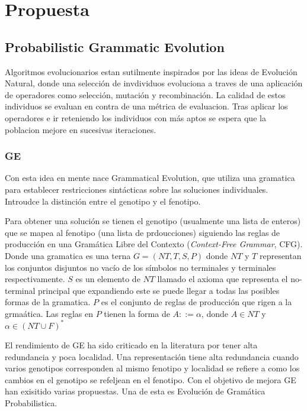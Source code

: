 \chapter{Propuesta}\label{chapter:proposal}

\section{Probabilistic Grammatic Evolution}

Algoritmos evolucionarios estan sutilmente inspirados por las ideas de Evoluci\'on Natural, donde una selecci\'on de invdividuos evoluciona a traves de una aplicaci\'on de operadores como selecci\'on, mutaci\'on y recombinaci\'on. La calidad de estos individuos se evaluan en contra de una m\'etrica de evaluacion. Tras aplicar los operadores e ir reteniendo los individuos con m\'as aptos se espera que la poblacion mejore en sucesivas iteraciones.

\subsection{GE}
Con esta idea en mente nace Grammatical Evolution, que utiliza una gramatica para establecer restricciones sint\'acticas sobre las soluciones individuales. Introudce la distinci\'on entre el genotipo y el fenotipo. 

Para obtener una soluci\'on se tienen el genotipo (usualmente una lista de enteros) que se mapea al fenotipo (una lista de prdoucciones) siguiendo las reglas de producci\'on en una Gram\'atica Libre del Contexto (\textit{Context-Free Grammar}, CFG). Donde una gramatica es una terna $G = (NT, T, S, P)$ donde $NT$ y $T$ representan los conjuntos disjuntos no vac\'io de los s\'imbolos no terminales y terminales respectivamente. $S$ es un elemento de $NT$ llamado el axioma que representa el no-terminal principal que expandiendo este se puede llegar a todas las posibles formas de la gramatica. $P$ es el conjunto de reglas de producci\'on que rigen a la grma\'atica. Las reglas en $P$ tienen la forma de $A ::= \alpha$, donde $A \in NT$ y  $\alpha \in (NT \cup F)^*$ 


El rendimiento de GE ha sido criticado en la literatura por tener alta redundancia y poca localidad. Una representaci\'on tiene alta redundancia cuando varios genotipos corresponden al mismo fenotipo y localidad se refiere a como los cambios en el genotipo se refeljean en el fenotipo. Con el objetivo de mejora GE han exisitido varias propuestas. Una de esta es Evoluci\'on de Gram\'atica Probabilistica.



